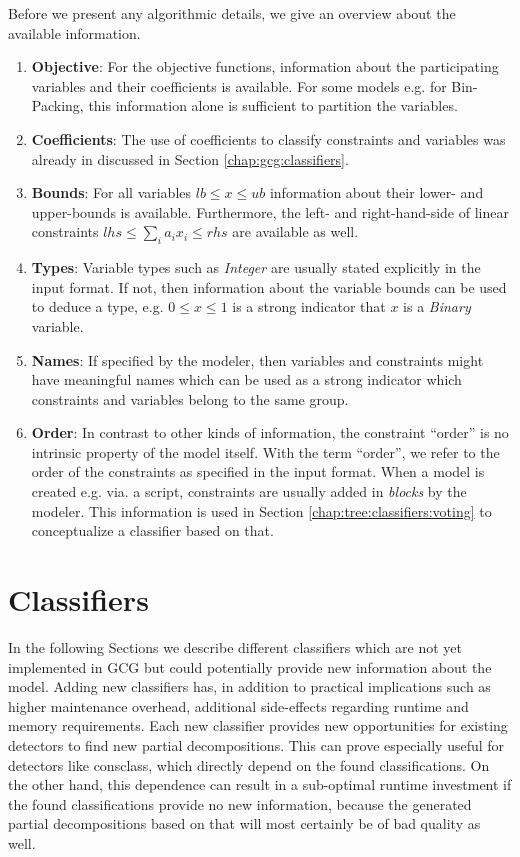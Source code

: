 		Before we present any algorithmic details, we give an overview about the available information.
		
		\begin{enumerate}
			\item \textbf{Objective}: For the objective functions, information about the participating variables and their coefficients is available. For some models e.g. for Bin-Packing, this information alone is sufficient to partition the variables.
			\item \textbf{Coefficients}:
			The use of coefficients to classify constraints and variables was already in discussed in Section \ref{chap:gcg:classifiers}.
			\item \textbf{Bounds}: For all variables $lb \leq x \leq ub$ information about their lower- and upper-bounds is available.
			Furthermore, the left- and right-hand-side of linear constraints $lhs \leq \sum_i a_i x_i \leq rhs$ are available as well.
			\item \textbf{Types}: Variable types such as \textit{Integer} are usually stated explicitly in the input format. If not, then information about the variable bounds can be used to deduce a type, e.g. $0 \leq x \leq 1$ is a strong indicator that $x$ is a \textit{Binary} variable.
			\item \textbf{Names}: If specified by the modeler, then variables and constraints might have meaningful names which can be used as a strong indicator which constraints and variables belong to the same group.
			\item \textbf{Order}: In contrast to other kinds of information, the constraint \enquote{order} is no intrinsic property of the model itself. With the term \enquote{order}, we refer to the order of the constraints as specified in the input format. When a model is created e.g. via. a script, constraints are usually added in \textit{blocks} by the modeler. This information is used in Section \ref{chap:tree:classifiers:voting} to conceptualize a classifier based on that.
		\end{enumerate}
	
	\section{Classifiers}
	
		In the following Sections we describe different classifiers which are not yet implemented in \ac{GCG} but could potentially provide new information about the model.
		Adding new classifiers has, in addition to practical implications such as higher maintenance overhead, additional side-effects regarding runtime and memory requirements.
		Each new classifier provides new opportunities for existing detectors to find new partial decompositions.
		This can prove especially useful for detectors like consclass, which directly depend on the found classifications.
		On the other hand, this dependence can result in a sub-optimal runtime investment if the found classifications provide no new information, because the generated partial decompositions based on that will most certainly be of bad quality as well. 
		
